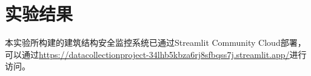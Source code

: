 \section{实验结果}
本实验所构建的建筑结构安全监控系统已通过Streamlit Community Cloud部署，可以通过\url{https://datacollectionproject-34lhb5kbza6rj8sfbqss7j.streamlit.app/}进行访问。

